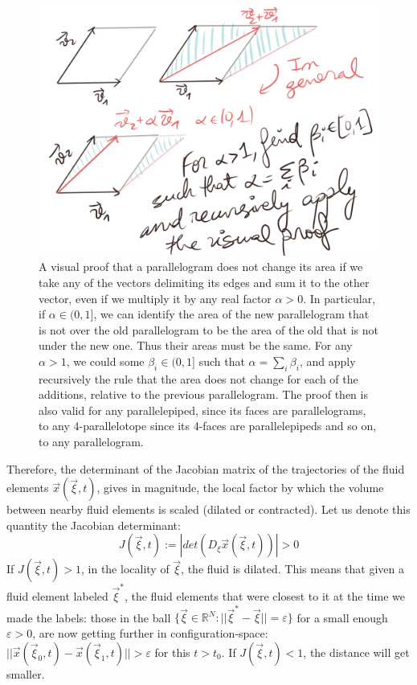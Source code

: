 \documentclass[11pt, a4paper]{article} %
\newcommand{\R}{\mathbb{R}} %
\begin{document}
\begin{figure}[h!]
  \centering
    \includegraphics[width=0.65\linewidth]{10parallelepipid.png}
  \caption{ A visual proof that a parallelogram does not change its area if we take any of the vectors delimiting its edges  and sum it to the other vector, even if we multiply it by any real factor $\alpha> 0$. In particular, if $\alpha\in(0,1]$, we can identify the area of the new parallelogram that is not over the old parallelogram to be the area of the old that is not under the new one. Thus their areas must be the same. For any $\alpha>1$, we could some $\beta_i\in(0,1]$ such that $\alpha=\sum_i\beta_i$, and apply recursively the rule that the area does not change for each of the additions, relative to the previous parallelogram. The proof then is also valid for any parallelepiped, since its faces are parallelograms, to any 4-parallelotope since its 4-faces are parallelepipeds and so on, to any parallelogram.  }
  \label{fig:volumeDet}
\end{figure}
Therefore, the determinant of the Jacobian matrix of the trajectories of the fluid elements $\vec{x}(\vec{\xi},t)$, gives in magnitude, the local factor by which the volume between nearby fluid elements is scaled (dilated or contracted). Let us denote this quantity the Jacobian determinant:
\begin{equation}
J(\vec{\xi},t):=|det (D_\xi \vec{x}(\vec{\xi},t))|>0
\end{equation}
If $J(\vec{\xi},t)>1$, in the locality of $\vec{\xi}$, the fluid is dilated. This means that given a fluid element labeled $\vec{\xi}^*$, the fluid elements that were closest to it at the time we made the labels: those in the ball $\{\vec{\xi}\in\R^N:||\vec{\xi}^*-\vec{\xi}||=\varepsilon\}$ for a small enough $\varepsilon>0$, are now getting further in configuration-space: $||\vec{x}(\vec{\xi}_0,t)-\vec{x}(\vec{\xi}_1,t)||>\varepsilon$ for this $t>t_0$. If $J(\vec{\xi},t)<1$, the distance will get smaller.
\end{document}
